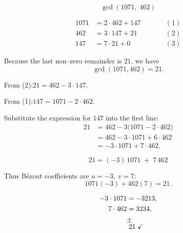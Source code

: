 \documentclass[12pt]{article}
\theoremstyle{definition} %
\theoremstyle{plain} %
\begin{document}
\[
  \boxed{\;\gcd(1071,\;462)\;}
  \]
  
  \begin{align}
  1071 &=  2\cdot 462 + 147    &\qquad&(1) \\[2pt]
  462  &=  3\cdot 147 +  21    &      &(2) \\[2pt]
  147  &=  7\cdot  21 +   0    &      &(3)
  \end{align}
  
  \smallskip
  Because the last non–zero remainder is \(21\), we have
  \[
  \gcd(1071,462)=21.
  \]
  
  \bigskip
  From (2):\quad \(21 = 462 - 3\cdot 147\).
  
  From (1):\quad \(147 = 1071 - 2\cdot 462\).
  
  Substitute the expression for \(147\) into the first line:
  \begin{align*}
  21
    &= 462 - 3\bigl(1071 - 2\cdot 462\bigr) \\[2pt]
    &= 462 - 3\cdot1071 + 6\cdot462 \\[2pt]
    &= -3\cdot1071 + 7\cdot462 .
  \end{align*}
  
  \[
  \boxed{\;21 = (-3)\,1071 \;+\; 7\,462\;}
  \]
  
  Thus Bézout coefficients are \(u=-3,\;v=7\):
  \[
  1071(-3)+462(7)=21.
  \]
  
  \begin{align*}
  -3\cdot1071 &= -3213,\\
  7\cdot462   &=  3234,\\
              &\underline{\smash{+}}\ \phantom{21}\\[-4pt]
              &\; 21\;\checkmark
  \end{align*}
  
\end{document}
